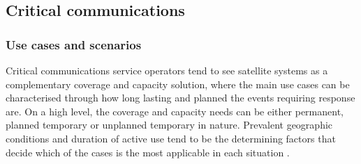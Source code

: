 \documentclass[english, 12pt, a4paper, elec, utf8, a-1b, online]{aaltothesis}
\begin{document}




\clearpage

\subsection{Critical communications}
\subsubsection{Use cases and scenarios}

Critical communications service operators tend to see satellite systems as a complementary coverage and capacity solution, where the main use cases can be characterised through how long lasting and planned the events requiring response are.
On a high level, the coverage and capacity needs can be either permanent, planned temporary or unplanned temporary in nature.
Prevalent geographic conditions and duration of active use tend to be the determining factors that decide which of the cases is the most applicable in each situation \cite{saynevirta2021satellite}.
\end{document}
